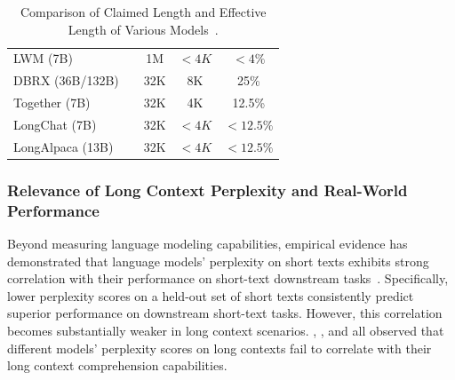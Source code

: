 \documentclass[11pt, a4paper, logo, copyright, nonumbering]{map}
\newcommand{\Checkmark}{\ding{51}} %
\begin{document}
\begin{table}[!htp]
\begin{tabular}{@{}lcccc@{}}
LWM (7B)                      & \Checkmark                    & 1M                     & $<4K$                      & $<4\%$                      \\
DBRX (36B/132B)               & \Checkmark                    & 32K                    & 8K                         & 25\%                     \\
Together (7B)                 & \Checkmark                    & 32K                    & 4K                         & 12.5\%                      \\
LongChat (7B)                 & \Checkmark                    & 32K                    & $<4K$                      & $<12.5\%$                      \\
LongAlpaca (13B)              & \Checkmark                    & 32K                    & $<4K$                      & $<12.5\%$                     \\ \bottomrule
\end{tabular}
\caption{Comparison of Claimed Length and Effective Length of Various Models~\cite{hsieh2024ruler}.}
\label{tab:model_lengths}
\end{table}









\subsubsection{Relevance of Long Context Perplexity and Real-World Performance}
Beyond measuring language modeling capabilities, empirical evidence has demonstrated that language models' perplexity on short texts exhibits strong correlation with their performance on short-text downstream tasks~\citep{huangcompression}. Specifically, lower perplexity scores on a held-out set of short texts consistently predict superior performance on downstream short-text tasks. However, this correlation becomes substantially weaker in long context scenarios. \citet{hu2024can}, \citet{an2023eval}, and \citet{sun2021long} all observed that different models' perplexity scores on long contexts fail to correlate with their long context comprehension capabilities.
\end{document}
